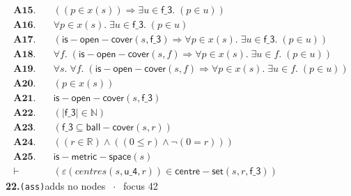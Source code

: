 \documentclass[11pt]{article}
\begin{document}
\begin{align*}
  \mathbf{A15.}\quad & ((p \in x(s)) \Rightarrow \exists u \in \mathsf{f\_3}.\; (p \in u)) \\
  \mathbf{A16.}\quad & \forall p \in x(s).\; \exists u \in \mathsf{f\_3}.\; (p \in u) \\
  \mathbf{A17.}\quad & (\mathsf{is{-}open{-}cover}(s, \mathsf{f\_3}) \Rightarrow \forall p \in x(s).\; \exists u \in \mathsf{f\_3}.\; (p \in u)) \\
  \mathbf{A18.}\quad & \forall f.\; (\mathsf{is{-}open{-}cover}(s, f) \Rightarrow \forall p \in x(s).\; \exists u \in f.\; (p \in u)) \\
  \mathbf{A19.}\quad & \forall s.\; \forall f.\; (\mathsf{is{-}open{-}cover}(s, f) \Rightarrow \forall p \in x(s).\; \exists u \in f.\; (p \in u)) \\
  \mathbf{A20.}\quad & (p \in x(s)) \\
  \mathbf{A21.}\quad & \mathsf{is{-}open{-}cover}(s, \mathsf{f\_3}) \\
  \mathbf{A22.}\quad & (|\mathsf{f\_3}| \in \mathbb{N}) \\
  \mathbf{A23.}\quad & (\mathsf{f\_3} \subseteq \mathsf{ball{-}cover}(s, r)) \\
  \mathbf{A24.}\quad & ((r \in \mathbb{R}) \wedge ((0 \leq r) \wedge \neg (0 = r))) \\
  \mathbf{A25.}\quad & \mathsf{is{-}metric{-}space}(s) \\
  \vdash\quad & (\varepsilon(\mathit{centres}(s, \mathsf{u\_4}, r)) \in \mathsf{centre{-}set}(s, r, \mathsf{f\_3}))
\end{align*}
\medskip\noindent\textbf{22.}\quad \texttt{(ass)}\hfill{\small adds no nodes $\;\cdot\;$ focus 42}\\[2pt]
\end{document}
